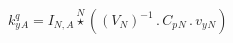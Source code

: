 \documentclass[border=2pt]{standalone}
\begin{document}
${{k^q_y}}{_{A}}={{I}}{_{N, A}} \stackrel{N}{\star} \left(\left( {V}{_{N}} \right)^{-1} \, . \, {{C_p}}{_{N}} \, . \, {{v_y}}{_{N}}\right)$
\end{document}
